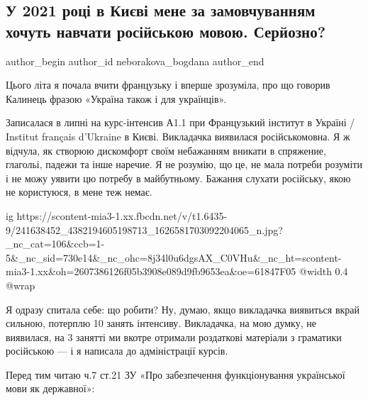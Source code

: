  
 
 
 
 
 
\subsection{У 2021 році в Києві мене за замовчуванням хочуть навчати російською мовою. Серйозно?}
\label{sec:08_09_2021.fb.neborakova_bogdana.1.jazyk_institut_francia_kursy}
 
\ifcmt
 author_begin
   author_id neborakova_bogdana
 author_end
\fi

Цього літа я почала вчити французьку і вперше зрозуміла, про що говорив
Калинець фразою «Україна також і для українців».

Записалася в липні на курс-інтенсив А1.1 при Французький інститут в Україні /
Institut français d'Ukraine в Києві. Викладачка виявилася російськомовна. Я ж
відчула, як створюю дискомфорт своїм небажанням вникати в спряжение, глагольі,
падежи та інше наречие. Я не розумію, що це, не мала потреби розуміти і не можу
уявити цю потребу в майбутньому. Бажання слухати російську, якою не користуюся,
в мене теж немає.

\ifcmt
  ig https://scontent-mia3-1.xx.fbcdn.net/v/t1.6435-9/241638452_4382194605198713_1626581703092204065_n.jpg?_nc_cat=106&ccb=1-5&_nc_sid=730e14&_nc_ohc=8j34l0u6dgsAX_C0VHu&_nc_ht=scontent-mia3-1.xx&oh=2607386126f05b3908e089d9fb9653ea&oe=61847F05
  @width 0.4
  @wrap 
\fi

Я одразу спитала себе: що робити? Ну, думаю, якщо викладачка виявиться вкрай
сильною, потерплю 10 занять інтенсиву. Викладачка, на мою думку, не виявилася,
на 3 занятті ми вкотре отримали роздаткові матеріали з граматики російською — і
я написала до адміністрації курсів.

Перед тим читаю ч.7 ст.21 ЗУ «Про забезпечення функціонування української мови
як державної»:

